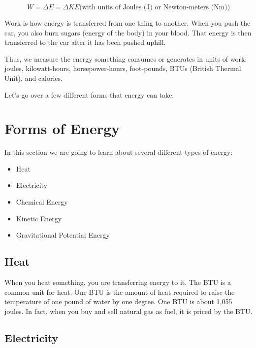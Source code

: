 
\[
W = \Delta E = \Delta KE \text{(with units of Joules (J) or Newton-meters (Nm))} 
\]


Work is how energy is transferred from one thing to another. When you push the 
car, you also burn sugars (energy of the body) in your blood. That energy is then
transferred to the car after it has been pushed uphill.

Thus, we measure the energy something consumes or generates in units of work: 
joules, kilowatt-hours, horsepower-hours, foot-pounds, BTUs (British Thermal 
Unit), and calories.

Let's go over a few different forms that energy can take.

\section{Forms of Energy}

In this section we are going to learn about several different types of energy:
\begin{itemize}
\item Heat
\item Electricity
\item Chemical Energy
\item Kinetic Energy
\item Gravitational Potential Energy
\end{itemize}

\subsection{Heat}

When you heat something, you are transferring energy to it. The BTU is a common 
unit for heat. One BTU is the amount of heat required to raise the temperature of 
one pound of water by one degree. One BTU is about 1,055 joules. In fact, when 
you buy and sell natural gas as fuel, it is priced by the BTU. 

\subsection{Electricity}

